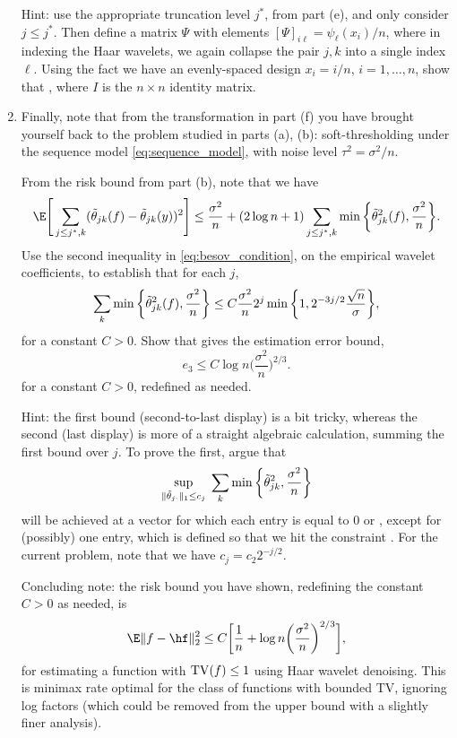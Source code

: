 \documentclass{article}
\begin{document}
\begin{enumerate}[label=(\alph*)]
  Hint: use the appropriate truncation level $j^*$, from part (e), and only
  consider $j \leq j^*$. Then define a matrix $\Psi$ with elements $[\Psi]_{i
    \ell} = \psi_\ell(x_i)/n$, where in indexing the Haar wavelets, we again
  collapse the pair $j,k$ into a single index $\ell$. Using the fact we have an
  evenly-spaced design $x_i = i/n$, $i=1,\dots,n$, show that , where $I$ is the $n \times n$ identity matrix.        

\item Finally, note that from the transformation in part (f) you have brought
  yourself back to the problem studied in parts (a), (b): soft-thresholding
  under the sequence model \eqref{eq:sequence_model}, with noise level $\tau^2 =
  \sigma^2/n$. 

  From the risk bound from part (b), note that we have
  \[
  \E\Bigg[ \sum_{j \leq j^*,k} (\ttheta_{jk}(f) - \ttheta_{jk}(y))^2 \Bigg] 
  \leq \frac{\sigma^2}{n} + (2 \log{n} + 1) \sum_{j \leq j^*,k} \min 
  \bigg \{ \ttheta_{jk}^2(f), \frac{\sigma^2}{n} \bigg\}.
  \]
  Use the second inequality in \eqref{eq:besov_condition}, on the empirical
  wavelet coefficients, to establish that for each $j$, 
  \marginpar{\small [4 pts]}
  \[
  \sum_k \min \bigg\{ \tilde\theta_{jk}^2(f), \frac{\sigma^2}{n} \bigg\} \leq
  C \frac{\sigma^2}{n} 2^j \min\bigg\{ 1, 2^{-3j/2} \frac{\sqrt{n}}{\sigma}
  \bigg\},  
  \]
  for a constant $C>0$. Show that gives the estimation error bound, 
  \marginpar{\small [2 pts]}
  \[
  e_3 \leq C \log{n} \bigg( \frac{\sigma^2}{n} \bigg)^{2/3}.
  \]
  for a constant $C>0$, redefined as needed.

  Hint: the first bound (second-to-last display) is a bit tricky, whereas the
  second (last display) is more of a straight algebraic calculation, summing the
  first bound over $j$. To prove the first, argue that 
  \[
  \sup_{\|\tilde\theta_{j \cdot}\|_1 \leq c_j} \; \sum_k \min \bigg\{
  \tilde\theta_{jk}^2, \frac{\sigma^2}{n} \bigg\}   
  \]
  will be achieved at a vector  for which each entry
  is equal to $0$ or , except for (possibly) one
  entry, which is defined so that we hit the constraint . For the current problem, note that we have $c_j = c_2
  2^{-j/2}$.   

  Concluding note: the risk bound you have shown, redefining the constant $C>0$
  as needed, is  
  \[
  \E \|f - \hf\|_2^2\leq C\bigg[ \frac{1}{n} + \log{n} \bigg(
  \frac{\sigma^2}{n} \bigg)^{2/3} \bigg],   
  \]
  for estimating a function with $\mathrm{TV}(f) \leq 1$ using Haar wavelet
  denoising. This is minimax rate optimal for the class of functions with
  bounded TV, ignoring log factors (which could be removed from the upper bound
  with a slightly finer analysis).
\end{enumerate}



\end{document}

